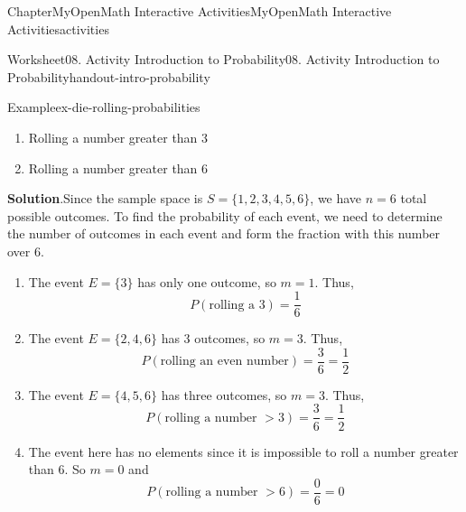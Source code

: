 \documentclass[oneside,10pt,]{book}
\newcommand{\blocktitlefont}{\relax}
\newlength{\fillinmaxwidth}
\newlength{\fillincontract}
\newlength{\charmaxwidth}\setlength{\charmaxwidth}{0.5em}
\newlength{\charminwidth}\setlength{\charminwidth}{0.1em}
\newlength{\fillinheight}
\newcommand{\fillintext}[1]{%
\setlength{\fillinmaxwidth}{#1\charmaxwidth}%
\setlength{\fillincontract}{#1\charminwidth}%
\setlength{\fillinheight}{\baselineskip}\addtolength{\fillinheight}{1.2pt}%
\strut\nobreak\leaders\vbox{\hrule width 0.3pt height 0.3pt \vskip -1.2pt}\hskip 1\fillinmaxwidth minus \fillincontract\nobreak\strut%
}
\newcommand{\gt}{>}
\begin{document}
\begin{chapterptx}{Chapter}{MyOpenMath Interactive Activities}{}{MyOpenMath Interactive Activities}{}{}{activities}
\begin{worksheet-section}{Worksheet}{08. Activity Introduction to Probability}{}{08. Activity Introduction to Probability}{}{}{handout-intro-probability}
\begin{example}{Example}{}{ex-die-rolling-probabilities}
\begin{enumerate}[label={\alph*}]
\item{}Rolling a number greater than 3%
\item{}Rolling a number greater than 6%
\end{enumerate}
%
\par\smallskip%
\noindent\textbf{\blocktitlefont Solution}.\hypertarget{ex-die-rolling-probabilities-2}{}\quad{}Since the sample space is \(S = \{1, 2, 3, 4, 5, 6\}\), we have \(n = 6\) total possible outcomes. To find the probability of each event, we need to determine the number of outcomes in each event and form the fraction with this number over \(6\).%
\par
%
\begin{enumerate}[label={\alph*}]
\item{}The event \(E = \{3\}\) has only one outcome, so \(m = 1\). Thus,%
\begin{equation*}
P(\text{rolling a 3}) = \frac{1}{6}
\end{equation*}
%
\item{}The event \(E = \{2, 4, 6\}\) has \(3\) outcomes, so \(m = 3\). Thus,%
\begin{equation*}
P(\text{rolling an even number}) = \frac{3}{6} = \frac{1}{2}
\end{equation*}
%
\item{}The event \(E = \{4, 5, 6\}\) has three outcomes, so \(m = 3\). Thus,%
\begin{equation*}
P(\text{rolling a number } \gt 3) = \frac{3}{6} = \frac{1}{2}
\end{equation*}
%
\item{}The event here has no elements since it is impossible to roll a number greater than \(6\). So \(m = 0\) and%
\begin{equation*}
P(\text{rolling a number } \gt 6) = \frac{0}{6} = 0
\end{equation*}
%
\end{enumerate}
%
\end{example}
\end{worksheet-section}
\end{chapterptx}
\end{document}
